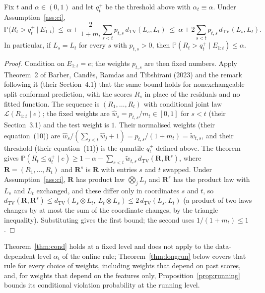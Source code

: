 \begin{theorem}\label{thm:cond}
Fix $t$ and $\alpha\in(0,1)$ and let $q_t^{+}$ be the threshold above with $\alpha_t\equiv\alpha$.
Under Assumption~\ref{ass:ci},
\[
 \mathbb P\bigl(R_t>q_t^{+}\ \big|\ E_{1:t}\bigr)\ \le\ \alpha+\frac{2}{1+m_t}\sum_{s<t}p_{t,s}\,
 d_{\mathrm{TV}}(L_s,L_t)\ \le\ \alpha+2\sum_{s<t}p_{t,s}\,d_{\mathrm{TV}}(L_s,L_t).
\]
In particular, if $L_s=L_t$ for every $s$ with $p_{t,s}>0$, then $\mathbb P(R_t>q_t^{+}\mid E_{1:t})\le\alpha$.
\end{theorem}

\begin{proof}
Condition on $E_{1:t}=e$; the weights $p_{t,s}$ are then fixed numbers. Apply Theorem~2 of
Barber, Cand\`es, Ramdas and Tibshirani (2023) and the remark following it (their Section~4.1) that the same
bound holds for nonexchangeable split conformal prediction, with the scores $R_s$ in place of the residuals and
no fitted function. The sequence is $(R_1,\dots,R_t)$ with conditional joint law $\mathcal L(R_{1:t}\mid e)$;
the fixed weights are $\hat w_s=p_{t,s}/m_t\in[0,1]$ for $s<t$ (their Section~3.1) and the test weight is $1$. Their normalised weights (their equation~(10)) are
$\hat w_s/(\sum_{j<t}\hat w_j+1)=p_{t,s}/(1+m_t)=\tilde w_{t,s}$, and their threshold (their equation~(11)) is the quantile
$q_t^{+}$ defined above. The theorem gives
$\mathbb P(R_t\le q_t^{+}\mid e)\ge 1-\alpha-\sum_{s<t}\tilde w_{t,s}\,d_{\mathrm{TV}}(\mathbf R,\mathbf R^{s})$,
where $\mathbf R=(R_1,\dots,R_t)$ and $\mathbf R^{s}$ is $\mathbf R$ with entries $s$ and $t$ swapped.
Under Assumption~\ref{ass:ci}, $\mathbf R$ has product law $\bigotimes_j L_j$ and $\mathbf R^{s}$ has the product law with
$L_s$ and $L_t$ exchanged, and these differ only in coordinates $s$ and $t$, so
$d_{\mathrm{TV}}(\mathbf R,\mathbf R^{s})\le d_{\mathrm{TV}}(L_s\otimes L_t,\ L_t\otimes L_s)\le 2\,d_{\mathrm{TV}}(L_s,L_t)$
(a product of two laws changes by at most the sum of the coordinate changes, by the triangle inequality).
Substituting gives the first bound; the second uses $1/(1+m_t)\le 1$.
\end{proof}

Theorem~\ref{thm:cond} holds at a fixed level and does not apply to the data-dependent level $\alpha_t$ of the online rule;
Theorem~\ref{thm:longrun} below covers that rule for every choice of weights, including weights that depend on past scores, and, for weights that depend on the features only, Proposition~\ref{prop:running} bounds its conditional violation probability at the running level.

